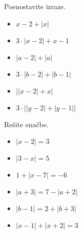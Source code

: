         \begin{naloga}
            Poenostavite izraze.
            \begin{itemize}
                    \item $x-2+\left\lvert x\right\rvert$ 
                    \item $3\cdot\left\lvert x-2\right\rvert +x-1$ 
                    \item $\left\lvert a-2\right\rvert+\left\lvert a\right\rvert$ 
                    \item $3\cdot \left\lvert b-2\right\rvert+\left\lvert b-1 \right\rvert$ 
                    \item $\left\lvert \lvert x-2\rvert +x \right\rvert$ 
                    \item $3\cdot \left\lvert \lvert y-2\rvert +\lvert y-1\rvert \right\rvert$ 

            \end{itemize}
        \end{naloga}


        \begin{naloga}
            Rešite enačbe.
            \begin{itemize}
                    \item $\left\lvert x-2 \right\rvert =3$ 
                    \item $\left\lvert 3-x\right\rvert =5$ 
                    \item $1+ \left\lvert x-7 \right\rvert =-6$ 
                    \item $\left\lvert a+3 \right\rvert = 7- \left\lvert a+2 \right\rvert$ 
                    \item $\left\lvert b-1 \right\rvert = 2 + \left\lvert b+3 \right\rvert$ 
                    \item $\left\lvert x-1 \right\rvert + \left\lvert x+2 \right\rvert =3$ 

            \end{itemize}
        \end{naloga}

